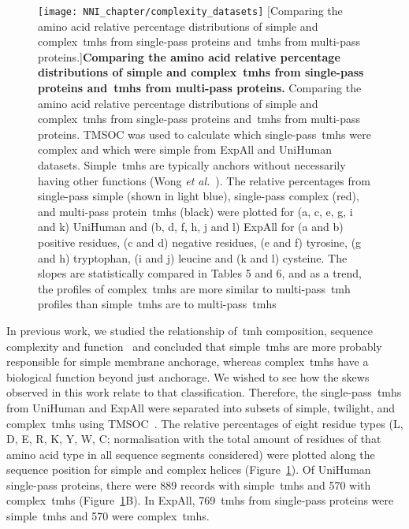 \begin{figure}[p]
\centering
\texttt{[image: NNI\_chapter/complexity\_datasets]}
[Comparing the amino acid relative percentage distributions of simple and complex~\gls{tmh}s from single-pass proteins and~\gls{tmh}s from multi-pass proteins.]{\textbf{Comparing the amino acid relative percentage distributions of simple and complex~\gls{tmh}s from single-pass proteins and~\gls{tmh}s from multi-pass proteins.} Comparing the amino acid relative percentage distributions of simple and complex~\gls{tmh}s from single-pass proteins and~\gls{tmh}s from multi-pass proteins.
TMSOC was used to calculate which single-pass~\gls{tmh}s were complex and which were simple from ExpAll and UniHuman datasets.
Simple~\gls{tmh}s are typically anchors without necessarily having other functions (Wong \textit{et al.}~\cite{Wong2010}).
The relative percentages from single-pass simple (shown in light blue), single-pass complex (red), and multi-pass protein~\gls{tmh}s (black) were plotted for (a, c, e, g, i and k) UniHuman and (b, d, f, h, j and l) ExpAll for (a and b) positive residues, (c and d) negative residues, (e and f) tyrosine, (g and h) tryptophan, (i and j) leucine and (k and l) cysteine.
The slopes are statistically compared in Tables 5 and 6, and as a trend, the profiles of complex~\gls{tmh}s are more similar to multi-pass~\gls{tmh} profiles than simple~\gls{tmh}s are to multi-pass~\gls{tmh}s}

\label{fig:complexity_datasets}
\end{figure}

In previous work, we studied the relationship of~\gls{tmh} composition, sequence complexity and function~\cite{Wong2010, Wong2011, Wong2012} and concluded that simple~\gls{tmh}s are more probably responsible for simple membrane anchorage, whereas complex~\gls{tmh}s have a biological function beyond just anchorage.
We wished to see how the skews observed in this work relate to that classification.
Therefore, the single-pass~\gls{tmh}s from UniHuman and ExpAll were separated into subsets of simple, twilight, and complex~\gls{tmh}s using TMSOC~\cite{Wong2011, Wong2012}.
The relative percentages of eight residue types (L, D, E, R, K, Y, W, C\@; normalisation with the total amount of residues of that amino acid type in all sequence segments considered) were plotted along the sequence position for simple and complex helices (Figure~\ref{fig:complexity_datasets}).
Of UniHuman single-pass proteins, there were 889 records with simple~\gls{tmh}s and 570 with complex~\gls{tmh}s (Figure~\ref{fig:complexity_datasets}B).
In ExpAll, 769~\gls{tmh}s from single-pass proteins were simple~\gls{tmh}s and 570 were complex~\gls{tmh}s.

